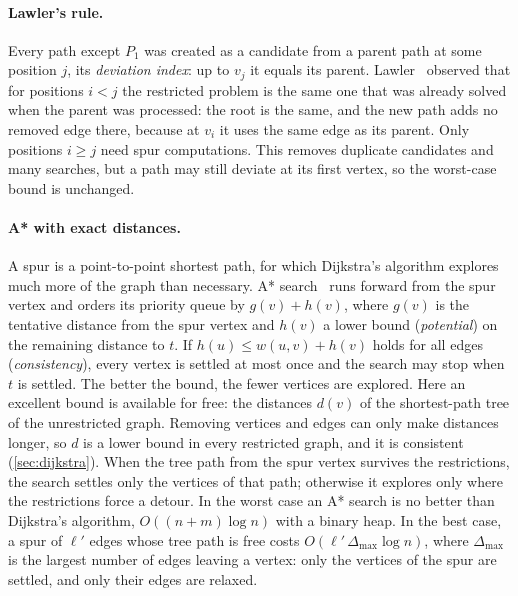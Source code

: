 \documentclass[11pt,a4paper]{article}
\begin{document}
\paragraph{Lawler's rule.} Every path except $P_1$ was created as a candidate from a parent path at some position
$j$, its \emph{deviation index}: up to $v_j$ it equals its parent. Lawler~\cite{lawler1972} observed that for
positions $i<j$ the restricted problem is the same one that was already solved when the parent was processed: the
root is the same, and the new path adds no removed edge there, because at $v_i$ it uses the same edge as its
parent. Only positions $i\ge j$ need spur computations. This removes duplicate candidates and many searches,
but a path may still deviate at its first vertex, so the worst-case bound is unchanged.

\paragraph{A* with exact distances.} A spur is a point-to-point shortest path, for which Dijkstra's algorithm
explores much more of the graph than necessary. A* search~\cite{hart1968} runs forward from the spur vertex and
orders its priority queue by $g(v)+h(v)$, where $g(v)$ is the tentative distance from the spur vertex and $h(v)$ a
lower bound (\emph{potential}) on the remaining distance to $t$. If $h(u)\le w(u,v)+h(v)$ holds for all edges
(\emph{consistency}), every vertex is settled at most once and the search may stop when $t$ is settled. The better
the bound, the fewer vertices are explored. Here an excellent bound is available for free: the distances $d(v)$ of
the shortest-path tree of the unrestricted graph. Removing vertices and edges can only make distances longer, so
$d$ is a lower bound in every restricted graph, and it is consistent (\cref{sec:dijkstra}). When the tree path from
the spur vertex survives the restrictions, the search settles only the vertices of that path; otherwise it explores
only where the restrictions force a detour. In the worst case an A* search is no better than Dijkstra's algorithm,
$O((n+m)\log n)$ with a binary heap. In the best case, a spur of $\ell'$ edges whose tree path is free costs
$O(\ell'\,\Delta_{\max}\log n)$, where $\Delta_{\max}$ is the largest number of edges leaving a vertex: only the
vertices of the spur are settled, and only their edges are relaxed.
\end{document}
